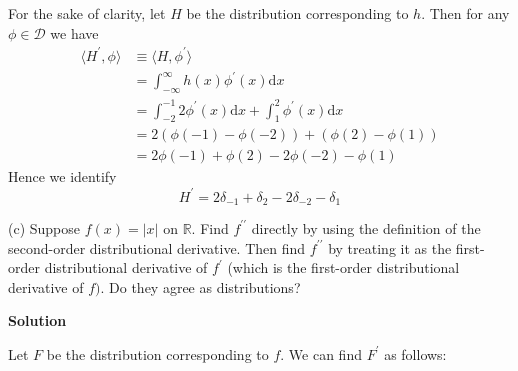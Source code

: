 \documentclass{article}
\begin{document}
For the sake of clarity, let $H$ be the distribution corresponding to
$h$. Then for any $\phi \in \mathcal{D}$ we have
%
\begin{align*}
    \langle H^\prime, \phi \rangle
        &\equiv \langle H, \phi^\prime \rangle \\
        &= \int_{- \infty}^{\infty} h(x) \phi^\prime(x) \mathrm{d} x \\
        &= \int_{-2}^{-1} 2 \phi^\prime(x) \mathrm{d} x
            + \int_{1}^{2} \phi^\prime(x) \mathrm{d} x \\
        &= 2 \left( \phi(-1) - \phi(-2) \right) + \left( \phi(2) - \phi(1) \right) \\
        &= 2 \phi(-1) + \phi(2) - 2 \phi(-2) - \phi(1)
\end{align*}
%
Hence we identify
%
\begin{equation*}
    H^\prime = 2 \delta_{-1} + \delta_2 - 2 \delta_{-2} - \delta_1
\end{equation*}

\vspace{5mm}

(c) Suppose $f(x) = |x|$ on $\mathbb{R}$. Find $f^{\prime \prime}$
directly by using the definition of the second-order distributional
derivative. Then find $f^{\prime \prime}$ by treating it as the
first-order distributional derivative of $f^{\prime}$ (which is the
first-order distributional derivative of $f)$. Do they agree as
distributions?

\textbf{Solution}

Let $F$ be the distribution corresponding to $f$. We can find $F^\prime$
as follows:
\end{document}
